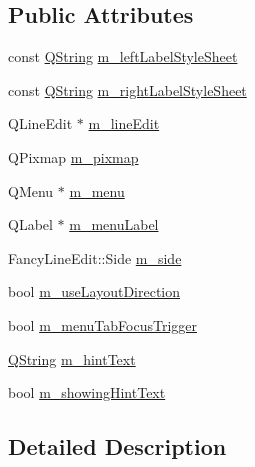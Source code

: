 \subsection*{\-Public \-Attributes}
\begin{DoxyCompactItemize}
\item 
const \hyperlink{group___u_a_v_objects_plugin_gab9d252f49c333c94a72f97ce3105a32d}{\-Q\-String} \hyperlink{class_utils_1_1_fancy_line_edit_private_ac6b25312f607b9026eb121613299c779}{m\-\_\-left\-Label\-Style\-Sheet}
\item 
const \hyperlink{group___u_a_v_objects_plugin_gab9d252f49c333c94a72f97ce3105a32d}{\-Q\-String} \hyperlink{class_utils_1_1_fancy_line_edit_private_a72ea68074cff6c0179e513bc1c92bcd3}{m\-\_\-right\-Label\-Style\-Sheet}
\item 
\-Q\-Line\-Edit $\ast$ \hyperlink{class_utils_1_1_fancy_line_edit_private_aa5c668f49cf8d8e523dd5aa4a8f08e3d}{m\-\_\-line\-Edit}
\item 
\-Q\-Pixmap \hyperlink{class_utils_1_1_fancy_line_edit_private_ad8bbe3f232d24f0176ef6754253b8d3a}{m\-\_\-pixmap}
\item 
\-Q\-Menu $\ast$ \hyperlink{class_utils_1_1_fancy_line_edit_private_a49c75a34391e9c7eb95f8d2db3629938}{m\-\_\-menu}
\item 
\-Q\-Label $\ast$ \hyperlink{class_utils_1_1_fancy_line_edit_private_af0626a7a7714a1a52ca2de3284baa07e}{m\-\_\-menu\-Label}
\item 
\-Fancy\-Line\-Edit\-::\-Side \hyperlink{class_utils_1_1_fancy_line_edit_private_ad60d06ba3fb014847644f73c494245b0}{m\-\_\-side}
\item 
bool \hyperlink{class_utils_1_1_fancy_line_edit_private_a54c91966247b6fded6bf5740e658e9ea}{m\-\_\-use\-Layout\-Direction}
\item 
bool \hyperlink{class_utils_1_1_fancy_line_edit_private_a9db3d32157258337faed26134c440674}{m\-\_\-menu\-Tab\-Focus\-Trigger}
\item 
\hyperlink{group___u_a_v_objects_plugin_gab9d252f49c333c94a72f97ce3105a32d}{\-Q\-String} \hyperlink{class_utils_1_1_fancy_line_edit_private_a9c00e4643180c89143ef729c7704e8e7}{m\-\_\-hint\-Text}
\item 
bool \hyperlink{class_utils_1_1_fancy_line_edit_private_a283cbbdaa3d8a3b4a2a422e1000f76b0}{m\-\_\-showing\-Hint\-Text}
\end{DoxyCompactItemize}


\subsection{\-Detailed \-Description}



